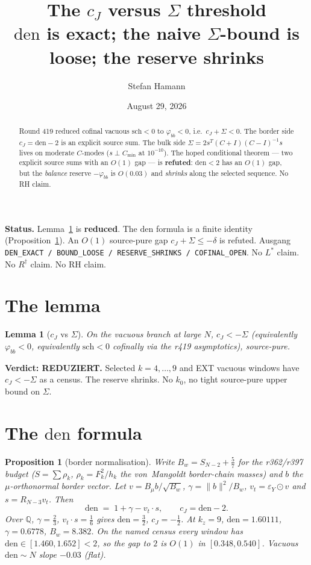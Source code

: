 \documentclass[11pt]{article}
\title{\bfseries The $c_J$ versus $\Sigma$ threshold\\[2mm]
\large $\mathrm{den}$ is exact; the naive $\Sigma$-bound is loose;
the reserve shrinks}
\author{Stefan Hamann}
\date{August 29, 2026}
\newtheorem{lemma}{Lemma}
\newtheorem{prop}{Proposition}
\theoremstyle{remark}
\newcommand{\phibb}{\varphi_{bb}}
\begin{document}
\maketitle

\begin{abstract}\noindent
Round 419 reduced cofinal vacuous $\mathrm{sch}<0$ to
$\phibb<0$, i.e.\ $c_J+\Sigma<0$.
The border side $c_J=\mathrm{den}-2$ is an explicit
source sum.
The bulk side $\Sigma=2s^{T}(C+I)(C-I)^{-1}s$ lives on
moderate $C$-modes ($s\perp C_{\min}$ at $10^{-10}$).
The hoped conditional theorem --- two explicit source
sums with an $O(1)$ gap --- is \textbf{refuted}:
$\mathrm{den}<2$ has an $O(1)$ gap, but the
\emph{balance} reserve $-\phibb$ is $O(0.03)$ and
\emph{shrinks} along the selected sequence.
No RH claim.
\end{abstract}

\medskip\noindent
\textbf{Status.}\enspace
Lemma~\ref{lem:cj} is \textbf{reduced}.
The $\mathrm{den}$ formula is a finite identity
(Proposition~\ref{prop:den}).
An $O(1)$ source-pure gap $c_J+\Sigma\le-\delta$ is
refuted.
Ausgang \texttt{DEN\_EXACT / BOUND\_LOOSE / RESERVE\_SHRINKS / COFINAL\_OPEN}.
No $L^{*}$ claim.  No $R^{\dagger}$ claim.  No RH claim.

\section{The lemma}\label{sec:lem}

\begin{lemma}[$c_J$ vs $\Sigma$]\label{lem:cj}
On the vacuous branch at large $N$,
$c_J<-\Sigma$ (equivalently $\phibb<0$, equivalently
$\mathrm{sch}<0$ cofinally via the r419 asymptotics),
source-pure.
\end{lemma}

\noindent
\textbf{Verdict: REDUZIERT.}
Selected $k=4,\ldots,9$ and EXT vacuous windows have
$c_J<-\Sigma$ as a census.
The reserve shrinks.
No $k_{0}$, no tight source-pure upper bound on $\Sigma$.

\section{The $\mathrm{den}$ formula}\label{sec:den}

\begin{prop}[border normalisation]\label{prop:den}
Write $B_w=S_{N-2}+\tfrac57$ for the r362/r397 budget
($S=\sum\rho_k$, $\rho_k=F_k^{2}/h_k$ the von~Mangoldt
border-chain masses) and $b$ the $\mu$-orthonormal
border vector.
Let $v=B_{\mu}b/\sqrt{B_w}$, $\gamma=\|b\|^{2}/B_w$,
$v_{t}=\varepsilon_{Y}\odot v$ and $s=R_{N-3}v_{t}$.
Then
\begin{equation}\label{eq:den}
\mathrm{den}
\;=\;
1+\gamma-v_{t}\cdot s,
\qquad
c_J=\mathrm{den}-2.
\end{equation}
Over $\mathbb{Q}$, $\gamma=\tfrac23$, $v_{t}\cdot s=\tfrac16$
gives $\mathrm{den}=\tfrac32$, $c_J=-\tfrac12$.
At $k_z=9$,
$\mathrm{den}=1.60111$, $\gamma=0.6778$, $B_w=8.382$.
On the named census every window has
$\mathrm{den}\in[1.460,1.652]<2$, so the gap to $2$ is
$O(1)$ in $[0.348,0.540]$.
Vacuous $\mathrm{den}\sim N$ slope $-0.03$ (flat).
\end{prop}
\end{document}
